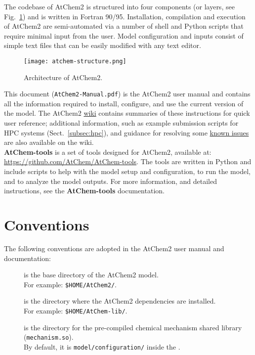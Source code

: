 The codebase of AtChem2 is structured into four components (or layers,
see Fig.~\ref{fig:atchem-arch}) and is written in Fortran 90/95.
Installation, compilation and execution of AtChem2 are semi-automated
via a number of shell and Python scripts that require minimal input
from the user. Model configuration and inputs consist of simple text
files that can be easily modified with any text editor.

\begin{figure}[htb]
  \centering
  \texttt{[image: atchem-structure.png]}
  \caption{Architecture of AtChem2.}
  \label{fig:atchem-arch}
\end{figure}

This document (\texttt{AtChem2-Manual.pdf}) is the AtChem2 user manual
and contains all the information required to install, configure, and
use the current version of the model. The AtChem2
\href{https://github.com/AtChem/AtChem2/wiki}{wiki} contains summaries
of these instructions for quick user reference; additional
information, such as example submission scripts for HPC systems
(Sect.~\ref{subsec:hpc}), and guidance for resolving some
\underline{known issues} are also available on the wiki.\\

\textbf{AtChem-tools} is a set of tools designed for AtChem2, available at:
\href{https://github.com/AtChem/AtChem-tools}{https://github.com/AtChem/AtChem-tools}.
The tools are written in Python and include scripts to help with the
model setup and configuration, to run the model, and to analyze the
model outputs. For more information, and detailed instructions, see
the \textbf{AtChem-tools} documentation.

\section{Conventions} \label{sec:conventions}

The following conventions are adopted in the AtChem2 user manual and
documentation:

\begin{description}
\item[\maindir] is the base directory of the AtChem2 model.\\
  For example: \texttt{\$HOME/AtChem2/}.
\item[\depdir] is the directory where the AtChem2 dependencies are installed.\\
  For example: \texttt{\$HOME/AtChem-lib/}.
\item[\sharedir] is the directory for the pre-compiled chemical
  mechanism shared library (\texttt{mechanism.so}).\\
  By default, it is \texttt{model/configuration/} inside the \maindir.
\end{description}

